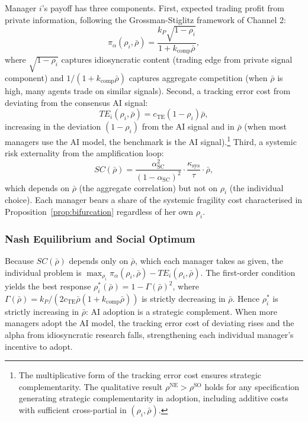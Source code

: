 Manager $i$'s payoff has three components. First, expected trading profit from private information, following the Grossman-Stiglitz framework of Channel 2:
\begin{equation}\label{eq:pi-alpha-adoption}
  \pi_\alpha(\rho_i, \bar{\rho}) = \frac{k_P \sqrt{1-\rho_i}}{1+k_{\text{comp}} \bar{\rho}},
\end{equation}
where $\sqrt{1-\rho_i}$ captures idiosyncratic content (trading edge from private signal component) and $1/(1+k_{\text{comp}} \bar{\rho})$ captures aggregate competition (when $\bar{\rho}$ is high, many agents trade on similar signals). Second, a tracking error cost from deviating from the consensus AI signal:
\begin{equation}\label{eq:tracking-error}
  TE_i(\rho_i, \bar{\rho}) = c_{\text{TE}} (1-\rho_i) \bar{\rho},
\end{equation}
increasing in the deviation $(1-\rho_i)$ from the AI signal and in $\bar{\rho}$ (when most managers use the AI model, the benchmark is the AI signal).\footnote{The multiplicative form of the tracking error cost ensures strategic complementarity. The qualitative result $\rho^{\text{NE}} > \rho^{\text{SO}}$ holds for any specification generating strategic complementarity in adoption, including additive costs with sufficient cross-partial in $(\rho_i, \bar{\rho})$.} Third, a systemic risk externality from the amplification loop:
\begin{equation}\label{eq:systemic-cost}
  SC(\bar{\rho}) = \frac{\alpha_{\text{SC}}^2}{(1-\alpha_{\text{SC}})^2} \cdot \frac{\kappa_{\text{sys}}}{\tau} \cdot \bar{\rho},
\end{equation}
which depends on $\bar{\rho}$ (the aggregate correlation) but not on $\rho_i$ (the individual choice). Each manager bears a share of the systemic fragility cost characterised in Proposition~\ref{prop:bifurcation} regardless of her own $\rho_i$.

\subsubsection{Nash Equilibrium and Social Optimum}

Because $SC(\bar{\rho})$ depends only on $\bar{\rho}$, which each manager takes as given, the individual problem is $\max_{\rho_i} \pi_\alpha(\rho_i, \bar{\rho}) - TE_i(\rho_i, \bar{\rho})$. The first-order condition yields the best response $\rho_i^*(\bar{\rho}) = 1 - \Gamma(\bar{\rho})^2$, where $\Gamma(\bar{\rho}) = k_P / (2 c_{\text{TE}} \bar{\rho}(1+k_{\text{comp}} \bar{\rho}))$ is strictly decreasing in $\bar{\rho}$. Hence $\rho_i^*$ is strictly increasing in $\bar{\rho}$: AI adoption is a strategic complement. When more managers adopt the AI model, the tracking error cost of deviating rises and the alpha from idiosyncratic research falls, strengthening each individual manager's incentive to adopt.

